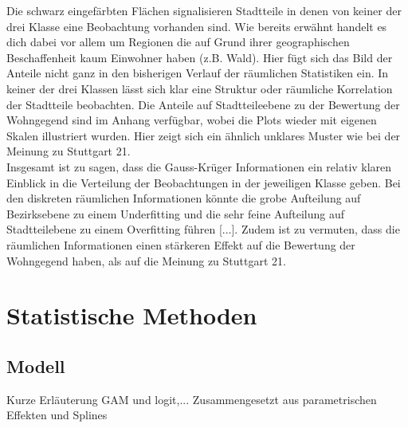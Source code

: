 \documentclass{Vorlage}
\begin{document}
Die schwarz eingefärbten Flächen signalisieren Stadtteile in denen von keiner der drei Klasse eine Beobachtung vorhanden sind. Wie bereits erwähnt handelt es dich dabei vor allem um Regionen die auf Grund ihrer geographischen Beschaffenheit kaum Einwohner haben (z.B. Wald). Hier fügt sich das Bild der Anteile nicht ganz in den bisherigen Verlauf der räumlichen Statistiken ein. In keiner der drei Klassen lässt sich klar eine Struktur oder räumliche Korrelation der Stadtteile beobachten. Die Anteile auf Stadtteileebene zu der Bewertung der Wohngegend sind im Anhang verfügbar, wobei die Plots wieder mit eigenen Skalen illustriert wurden. Hier zeigt sich ein ähnlich unklares Muster wie bei der Meinung zu Stuttgart 21.\\
Insgesamt ist zu sagen, dass die Gauss-Krüger Informationen ein relativ klaren Einblick in die Verteilung der Beobachtungen in der jeweiligen Klasse geben. Bei den diskreten räumlichen Informationen könnte die grobe Aufteilung auf Bezirksebene zu einem Underfitting und die sehr feine Aufteilung auf Stadtteilebene zu einem Overfitting führen [...]. Zudem ist zu vermuten, dass die räumlichen Informationen einen stärkeren Effekt auf die Bewertung der Wohngegend haben, als auf die Meinung zu Stuttgart 21.

\section{Statistische Methoden}

\subsection{Modell}
Kurze Erläuterung GAM und logit,... Zusammengesetzt aus parametrischen Effekten und Splines
\end{document}
